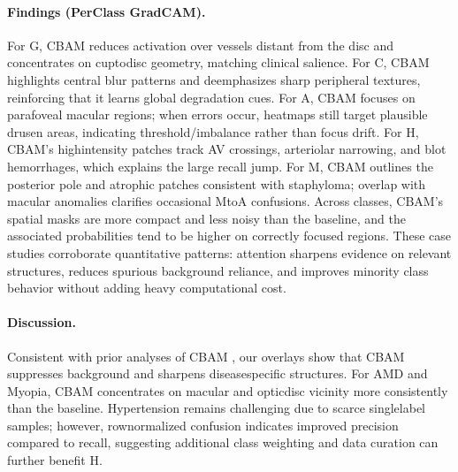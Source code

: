 \paragraph{Findings (Per\textendash Class Grad\textendash CAM).}
For G, CBAM reduces activation over vessels distant from the disc and concentrates on cup\textendash to\textendash disc geometry, matching clinical salience. For C, CBAM highlights central blur patterns and de\textendash emphasizes sharp peripheral textures, reinforcing that it learns global degradation cues. For A, CBAM focuses on parafoveal macular regions; when errors occur, heatmaps still target plausible drusen areas, indicating threshold/imbalance rather than focus drift. For H, CBAM’s high\textendash intensity patches track AV crossings, arteriolar narrowing, and blot hemorrhages, which explains the large recall jump. For M, CBAM outlines the posterior pole and atrophic patches consistent with staphyloma; overlap with macular anomalies clarifies occasional M\textendash to\textendash A confusions. Across classes, CBAM’s spatial masks are more compact and less noisy than the baseline, and the associated probabilities tend to be higher on correctly focused regions. These case studies corroborate quantitative patterns: attention sharpens evidence on relevant structures, reduces spurious background reliance, and improves minority class behavior without adding heavy computational cost.

\paragraph{Discussion.} Consistent with prior analyses of CBAM \cite{cbamDO,cbamMedium,woo2018cbam}, our overlays show that CBAM suppresses background and sharpens disease\textendash specific structures. For AMD and Myopia, CBAM concentrates on macular and optic\textendash disc vicinity more consistently than the baseline. Hypertension remains challenging due to scarce single\textendash label samples; however, row\textendash normalized confusion indicates improved precision compared to recall, suggesting additional class weighting and data curation can further benefit H.

